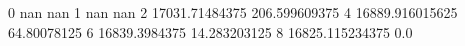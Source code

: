 0 nan nan
1 nan nan
2 17031.71484375 206.599609375
4 16889.916015625 64.80078125
6 16839.3984375 14.283203125
8 16825.115234375 0.0
